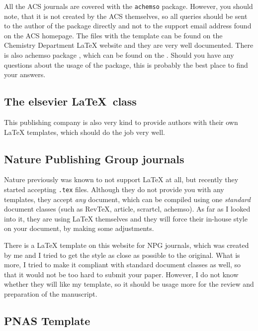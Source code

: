 All the ACS journals are covered with the \verb|achemso| package. 
%
However, you should note, that it is not created by the ACS themselves, so all
queries should be sent to the author of the package directly and not to the
support email address found on the ACS homepage.
%
The files with the template can be found on the Chemistry Department
\LaTeX{} website and they are very well documented.
%
There is also achemso package
,
which can be found on the
.
%
Should you have any questions about the usage of the package, this is probably
the best place to find your answers.

\subsection{The elsevier \LaTeX\ class}

This publishing company is also very kind to provide authors with their own
\LaTeX{} templates, which should do the job very well.

\subsection{Nature Publishing Group journals}

Nature previously was known to not support \LaTeX{} at all, but recently they
started accepting \verb|.tex| files.
%
Although they do not provide you with any templates, they accept \emph{any}
document, which can be compiled using one \emph{standard} document classes (such
as RevTeX, article, scrartcl, achemso).
%
As far as I looked into it, they are using \LaTeX{} themselves and they will
force their in-house style on your document, by making some adjustments.



There is a \LaTeX{} template on this website for NPG journals, which was created
by me and I tried to get the style as close as possible to the original.
%
What is more, I tried to make it compliant with standard document classes as
well, so that it would not be too hard to submit your paper.
%
However, I do not know whether they will like my template, so it should be usage
more for the review and preparation of the manuscript.

\subsection{PNAS Template}


